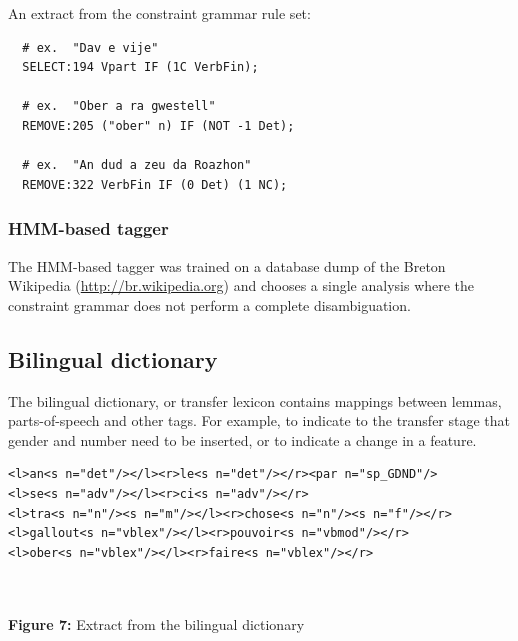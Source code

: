 \documentclass[a0,landscape]{a0poster}
\begin{document}
\begin{multicols}{4}
\noindent
An extract from the constraint grammar rule set:\\

\begin{small}
\begin{verbatim}
  # ex.  "Dav e vije"
  SELECT:194 Vpart IF (1C VerbFin);

  # ex.  "Ober a ra gwestell"
  REMOVE:205 ("ober" n) IF (NOT -1 Det);

  # ex.  "An dud a zeu da Roazhon"
  REMOVE:322 VerbFin IF (0 Det) (1 NC);
\end{verbatim}
\end{small}

\subsubsection{HMM-based tagger}

\noindent
The HMM-based tagger was trained on a database dump of the Breton Wikipedia (\url{http://br.wikipedia.org}) and
chooses a single analysis where the constraint grammar does not perform a complete disambiguation.\\

\subsection{Bilingual dictionary}

\noindent
The bilingual dictionary, or transfer lexicon contains mappings between lemmas,
parts-of-speech and other tags. For example, to indicate to the transfer stage
that gender and number need to be inserted, or to indicate a change in a feature.\\

\begin{center}
\begin{minipage}[b]{26cm}
\begin{small}
\begin{verbatim}
<l>an<s n="det"/></l><r>le<s n="det"/></r><par n="sp_GDND"/>
<l>se<s n="adv"/></l><r>ci<s n="adv"/></r>
<l>tra<s n="n"/><s n="m"/></l><r>chose<s n="n"/><s n="f"/></r>
<l>gallout<s n="vblex"/></l><r>pouvoir<s n="vbmod"/></r>
<l>ober<s n="vblex"/></l><r>faire<s n="vblex"/></r>
\end{verbatim}
\end{small}
\end{minipage}\\
~\\
\textbf{Figure 7:} Extract from the bilingual dictionary
\vspace{0.3cm}
\end{center}


\end{multicols}
\end{document}
